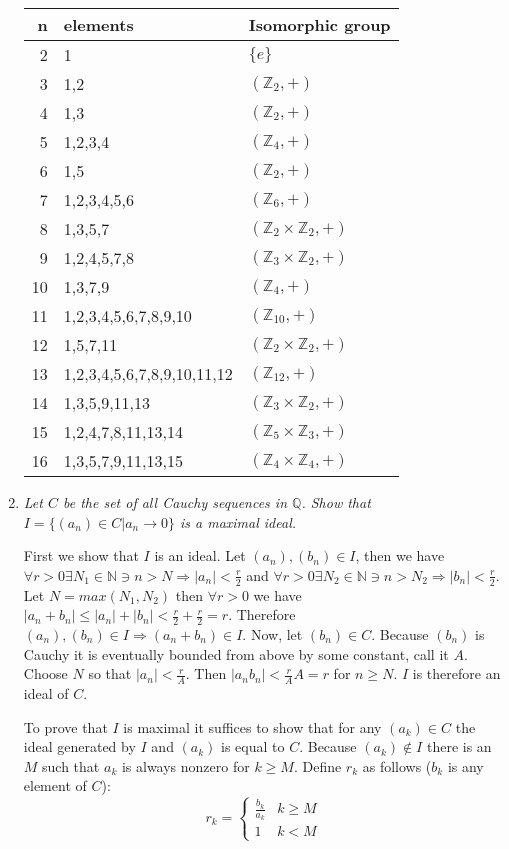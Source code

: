 \documentclass[11pt]{article}
\begin{document}
\begin{enumerate}
\begin{tabular}{r|l|l}
n	&	elements			& Isomorphic group \\
\hline
2	&	1				& $\{e\}$ \\ 
3	&	1,2				& $(\mathbb{Z}_2,+)$ \\ 
4	&	1,3				& $(\mathbb{Z}_2,+)$ \\ 
5	&	1,2,3,4				& $(\mathbb{Z}_4,+)$ \\ 
6	&	1,5				& $(\mathbb{Z}_2,+)$ \\ 
7	&	1,2,3,4,5,6			& $(\mathbb{Z}_6,+)$ \\ 
8	&	1,3,5,7				& $(\mathbb{Z}_2 \times \mathbb{Z}_2,+)$ \\ 
9	&	1,2,4,5,7,8			& $(\mathbb{Z}_3 \times \mathbb{Z}_2,+)$ \\ 
10	&	1,3,7,9				& $(\mathbb{Z}_4,+)$ \\ 
11	&	1,2,3,4,5,6,7,8,9,10		& $(\mathbb{Z}_{10},+)$ \\ 
12	&	1,5,7,11			& $(\mathbb{Z}_2 \times \mathbb{Z}_2,+)$ \\ 
13	&	1,2,3,4,5,6,7,8,9,10,11,12	& $(\mathbb{Z}_{12},+)$ \\ 
14	&	1,3,5,9,11,13			& $(\mathbb{Z}_3 \times \mathbb{Z}_2, +)$ \\ 
15	&	1,2,4,7,8,11,13,14		& $(\mathbb{Z}_5 \times \mathbb{Z}_3,+)$ \\
16	&	1,3,5,7,9,11,13,15		& $(\mathbb{Z}_4 \times \mathbb{Z}_4,+)$
\end{tabular}

\item \emph{Let $C$ be the set of all Cauchy sequences in $\mathbb{Q}$. Show that $I=\{(a_n) \in C | a_n \rightarrow 0\}$ is a maximal ideal.}

First we show that  $I$ is an ideal.  Let $(a_n),(b_n) \in I$, then we have $\forall r>0 \exists N_1 \in \mathbb{N} \ni n>N \Rightarrow |a_n|<\frac{r}{2}$ and $\forall r>0 \exists N_2 \in \mathbb{N} \ni n>N_2 \Rightarrow |b_n|<\frac{r}{2}$.  Let $N=max(N_1,N_2)$ then $\forall r>0$ we have $|a_n + b_n| \leq |a_n| + |b_n| < \frac{r}{2} + \frac{r}{2} = r$.  Therefore $(a_n),(b_n) \in I \Rightarrow (a_n + b_n) \in I$.  Now, let $(b_n) \in C$.  Because $(b_n)$ is Cauchy it is eventually bounded from above by some constant, call it $A$.  Choose $N$ so that $|a_n| < \frac{r}{A}$.  Then $|a_nb_n|<\frac{r}{A}A = r$ for $n \geq N$.  $I$ is therefore an ideal of $C$.

To prove that $I$ is maximal it suffices to show that for any $(a_k) \in C$ the ideal generated by $I$ and $(a_k)$ is equal to $C$.  Because $(a_k) \notin I$ there is an $M$ such that $a_k$ is always nonzero for $k \geq M$.  Define $r_k$ as follows ($b_k$ is any element of $C$):
\[ r_k = \left\{
              \begin{array}{ll}
                   \frac{b_k}{a_k} & k \geq M\\
                   1 & k < M
              \end{array}
       \right.
\]


\end{enumerate}
\end{document}
